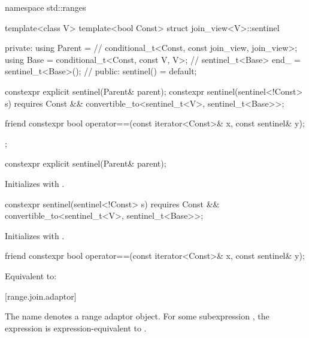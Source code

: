 \begin{codeblock}
namespace std::ranges {
  template<class V>
  template<bool Const>
  struct join_view<V>::sentinel {
  private:
    using Parent =                                      // \expos
      conditional_t<Const, const join_view, join_view>;
    using Base   = conditional_t<Const, const V, V>;    // \expos
    sentinel_t<Base> end_ = sentinel_t<Base>();         // \expos
  public:
    sentinel() = default;

    constexpr explicit sentinel(Parent& parent);
    constexpr sentinel(sentinel<!Const> s)
      requires Const && convertible_to<sentinel_t<V>, sentinel_t<Base>>;

    friend constexpr bool operator==(const iterator<Const>& x, const sentinel& y);
  };
}
\end{codeblock}

\begin{itemdecl}
constexpr explicit sentinel(Parent& parent);
\end{itemdecl}

\begin{itemdescr}
\pnum
\effects Initializes  with .
\end{itemdescr}

\begin{itemdecl}
constexpr sentinel(sentinel<!Const> s)
  requires Const && convertible_to<sentinel_t<V>, sentinel_t<Base>>;
\end{itemdecl}

\begin{itemdescr}
\pnum
\effects Initializes  with .
\end{itemdescr}

\begin{itemdecl}
friend constexpr bool operator==(const iterator<Const>& x, const sentinel& y);
\end{itemdecl}

\begin{itemdescr}
\pnum
\effects Equivalent to: 
\end{itemdescr}

[range.join.adaptor]{}

\pnum
The name  denotes a
range adaptor object.
For some subexpression , the expression
 is expression-equivalent to
.

